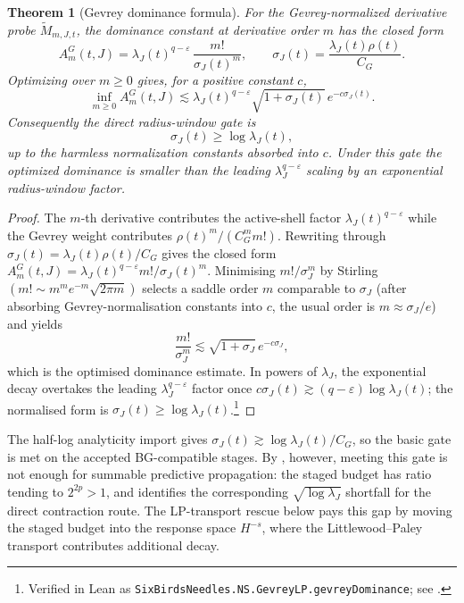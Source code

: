 \documentclass[11pt]{article}
\newcommand{\eps}{\varepsilon}
\newcommand{\CG}{C_G}
\newcommand{\sigmaJ}{\sigma_J}
\newcommand{\lambdaJ}{\lambda_J}
\newtheorem{theorem}{Theorem}[section]
\theoremstyle{definition}
\begin{document}
\begin{theorem}[Gevrey dominance formula]\label{thm:ns:gevrey-dominance}
For the Gevrey-normalized derivative probe
\(\widetilde M_{m,J,t}\), the dominance constant at derivative order
\(m\) has the closed form
\[
  A_m^G(t,J)
  =
  \lambdaJ(t)^{q-\eps}\,
  \frac{m!}{\sigmaJ(t)^m},
  \qquad
  \sigmaJ(t)=\frac{\lambdaJ(t)\rho(t)}{\CG}.
\]
Optimizing over \(m\ge 0\) gives, for a positive constant \(c\),
\[
  \inf_{m\ge 0} A_m^G(t,J)
  \lesssim
  \lambdaJ(t)^{q-\eps}\sqrt{1+\sigmaJ(t)}\,
  e^{-c\sigmaJ(t)} .
\]
Consequently the direct radius-window gate is
\[
  \sigmaJ(t)\ge \log\lambdaJ(t),
\]
up to the harmless normalization constants absorbed into \(c\).  Under
this gate the optimized dominance is smaller than the leading
\(\lambdaJ^{q-\eps}\) scaling by an exponential radius-window factor.
\end{theorem}

\begin{proof}
The \(m\)-th derivative contributes the active-shell factor
\(\lambdaJ(t)^{q-\eps}\) while the Gevrey weight contributes
\(\rho(t)^m/(\CG^m m!)\).  Rewriting through
\(\sigmaJ(t)=\lambdaJ(t)\rho(t)/\CG\) gives the closed form
\(A_m^G(t,J)=\lambdaJ(t)^{q-\eps}m!/\sigmaJ(t)^m\).  Minimising
\(m!/\sigmaJ^m\) by Stirling~\citep{AbramowitzStegun1964}
\((m!\sim m^m e^{-m}\sqrt{2\pi m})\) selects a saddle order \(m\)
comparable to \(\sigmaJ\) (after absorbing Gevrey-normalisation
constants into \(c\), the usual order is \(m\approx\sigmaJ/e\)) and
yields
\[
  \frac{m!}{\sigmaJ^m}
  \lesssim
  \sqrt{1+\sigmaJ}\,e^{-c\sigmaJ},
\]
which is the optimised dominance estimate.  In powers of
\(\lambdaJ\), the exponential decay overtakes the leading
\(\lambdaJ^{q-\eps}\) factor once
\(c\sigmaJ(t)\gtrsim(q-\eps)\log\lambdaJ(t)\); the normalised form is
\(\sigmaJ(t)\ge \log\lambdaJ(t)\).\footnote{Verified in Lean as \texttt{SixBirdsNeedles.NS.GevreyLP.gevreyDominance}; see .}
\end{proof}

\noindent
The half-log analyticity import gives
\(\sigmaJ(t)\gtrsim\log\lambdaJ(t)/\CG\), so the basic gate is met on
the accepted BG-compatible stages.  By
, however, meeting this gate is
not enough for summable predictive propagation: the staged budget has
ratio tending to \(2^{2p}>1\), and
 identifies the corresponding
\(\sqrt{\log\lambdaJ}\) shortfall for the direct contraction route.
The LP-transport rescue below pays this gap by moving the staged
budget into the response space \(H^{-s}\), where the
Littlewood--Paley transport contributes additional decay.
\end{document}
